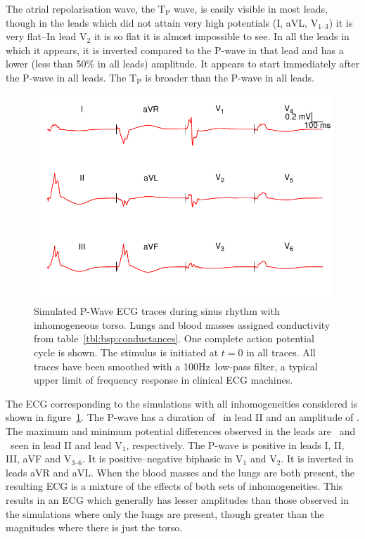 The atrial repolarisation wave, the $\text{T}_{\text{P}}$ wave, is easily
visible in most leads, though in the leads which did not attain very high
potentials (I, aVL, $\text{V}_{\text{1--3}}$) it is very flat--In lead
$\text{V}_{\text{2}}$ it is so flat it is almost impossible to see.
In all the leads in which it appears, it is inverted compared to the P-wave in
that lead and has a lower (less than 50\% in all leads) amplitude.
It appears to start immediately after the P-wave in all leads.
The $\text{T}_{\text{P}}$ is broader than the P-wave in all leads.

\begin{figure}
\includegraphics{figures/bsp/ecg_all}
\caption[12 lead ECG during sinus rhythm, all internal inhomogeneities present.]{
\label{bsp:fig:ecg_all}
Simulated P-Wave ECG traces during sinus rhythm with inhomogeneous torso.
Lungs and blood masses assigned conductivity from table~\ref{tbl:bsp:conductances}.
One complete action potential cycle is shown.
The stimulus is initiated at $t = 0$ in all traces.
All traces have been smoothed with a \unit{100}{Hz}\ low-pass filter, a typical
upper limit of frequency response in clinical ECG machines.
}
\end{figure}

The ECG corresponding to the simulations with all inhomogeneities considered is shown in
figure~\ref{bsp:fig:ecg_all}.
The P-wave has a duration of \ in lead II and an amplitude of .
The maximum and minimum potential differences observed in the leads are
\ and \ seen in lead II and lead $\text{V}_{\text{1}}$, respectively.
The P-wave is positive in leads I, II, III, aVF and $\text{V}_{\text{3--6}}$.
It is positive--negative biphasic in $\text{V}_{\text{1}}$ and $\text{V}_{\text{2}}$.
It is inverted in leads aVR and aVL.
When the blood masses and the lungs are both present, the resulting ECG is a
mixture of the effects of both sets of inhomogeneities.
This results in an ECG which generally has lesser amplitudes than those observed
in the simulations where only the lungs are present, though greater than the
magnitudes where there is just the torso.

